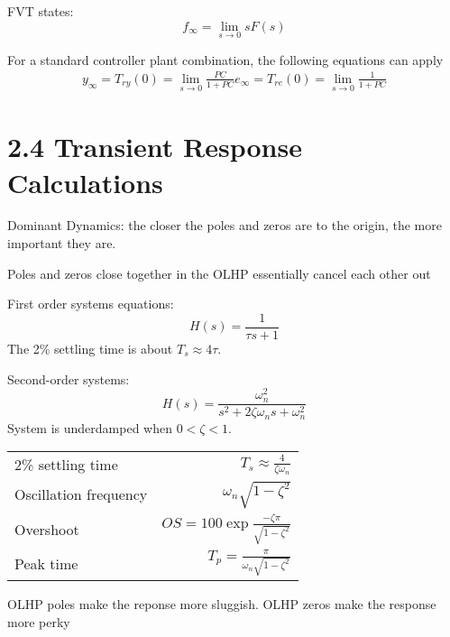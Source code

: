 FVT states:
\begin{equation*}
    f_\infty = \lim_{s \rightarrow 0}sF(s)
\end{equation*}

For a standard controller plant combination, the following equations can apply
\begin{equation*}
    \begin{aligned}
        y_\infty = T_{ry}(0) = \lim_{s \rightarrow 0} \frac{PC}{1 + PC}
        e_\infty = T_{re}(0) = \lim_{s \rightarrow 0} \frac{1}{1 + PC}
    \end{aligned}
\end{equation*}

\section*{2.4 Transient Response Calculations}

Dominant Dynamics: the closer the poles and zeros are to the origin, the more important they are.

Poles and zeros close together in the OLHP essentially cancel each other out

First order systems equations:
\begin{equation*}
    H(s) = \frac{1}{\tau s + 1}
\end{equation*}
The 2\% settling time is about \( T_s \approx 4 \tau \).

Second-order systems:
\begin{equation*}
    H(s) = \frac{\omega_n^2}{s^2 + 2 \zeta \omega_n s + \omega_n^2}
\end{equation*}
System is underdamped when \( 0 < \zeta < 1 \).


\begin{tabular}{l r}
    2\% settling time     & \(T_s \approx \frac{4}{\zeta\omega_n}\)               \\
    Oscillation frequency & \( \omega_n \sqrt{1-\zeta^2}\)                        \\
    Overshoot             & \( OS = 100\exp{\frac{-\zeta\pi}{\sqrt{1-\zeta^2}}}\) \\
    Peak time             & \( T_p = \frac{\pi}{\omega_n\sqrt{1-\zeta^2}}\)       \\
\end{tabular}

OLHP poles make the reponse more sluggish.
OLHP zeros make the response more perky

